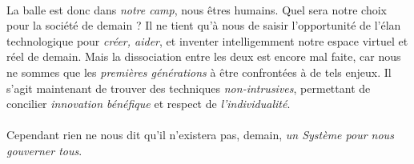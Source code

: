 \paragraph{} La balle est donc dans \emph{notre camp}, nous êtres humains. Quel sera
notre choix pour la société de demain ? Il ne tient qu'à nous de saisir
l'opportunité de l'élan technologique pour \emph{créer, aider}, et inventer
intelligemment notre espace virtuel et réel de demain. Mais la dissociation entre
les deux est encore mal faite, car nous ne sommes que les \emph{premières générations}
à être confrontées à de tels enjeux. Il s'agit maintenant de trouver des techniques
\emph{non-intrusives}, permettant de concilier \emph{innovation bénéfique} et
respect de \emph{l'individualité}.

\paragraph{} Cependant rien ne nous dit qu'il n'existera pas, demain, \emph{un Système pour nous
gouverner tous}.